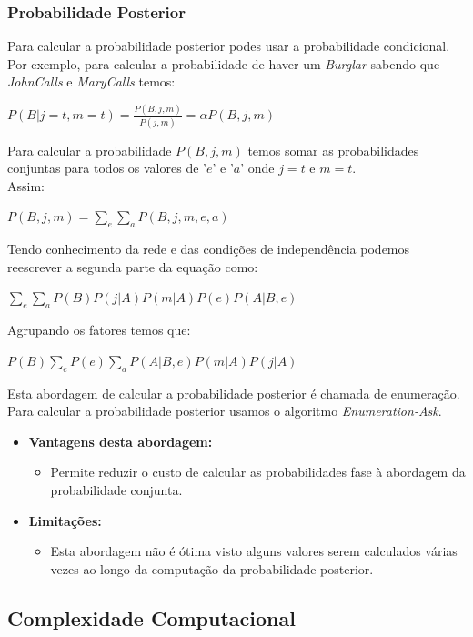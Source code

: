 \documentclass[9pt, a4paper, twocolumn]{article}
\begin{document}
\subsubsection{Probabilidade Posterior}
\hspace{10mm}Para calcular a probabilidade posterior podes usar a probabilidade condicional. Por exemplo, para calcular a probabilidade de haver um \textit{Burglar} sabendo que \textit{JohnCalls} e \textit{MaryCalls} temos:
\begin{center}
$P(B|j=t, m=t)=\displaystyle\frac{P(B,j,m)}{P(j,m)}=\alpha P(B,j,m)$
\end{center}
Para calcular a probabilidade $P(B, j, m)$ temos somar as probabilidades conjuntas para todos os valores de '$e$' e '$a$' onde $j=t$ e $m=t$.\\
Assim:
\begin{center}
$P(B, j, m) = \displaystyle\sum_{e}\sum_{a}P(B, j, m, e, a)$
\end{center}
Tendo conhecimento da rede e das condições de independência podemos reescrever a segunda parte da equação como:
\begin{center}
$\displaystyle\sum_{e}\sum_{a}P(B)P(j|A)P(m|A)P(e)P(A|B,e)$
\end{center}
Agrupando os fatores temos que:
\begin{center}
$P(B)\displaystyle\sum_{e}P(e)\displaystyle\sum_{a}P(A|B, e)P(m|A)P(j|A)$
\end{center}
Esta abordagem de calcular a probabilidade posterior é chamada de enumeração. Para calcular a probabilidade posterior usamos o algoritmo \emph{Enumeration-Ask}.
\begin{itemize}
\item \textbf{Vantagens desta abordagem:}
\begin{itemize}
\item Permite reduzir o custo de calcular as probabilidades fase à abordagem da probabilidade conjunta.
\end{itemize}
\item \textbf{Limitações:}
\begin{itemize}
\item Esta abordagem não é ótima visto alguns valores serem calculados várias vezes ao longo da computação da probabilidade posterior.
\end{itemize}
\end{itemize}
\subsection{Complexidade Computacional}
\end{document}
